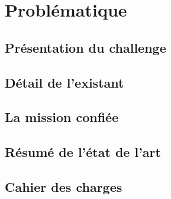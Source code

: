 \chapter{Problématique}

\section{Présentation du challenge}

\section{Détail de l’existant}

\section{La mission confiée}

\section{Résumé de l’état de l’art}

\section{Cahier des charges}

